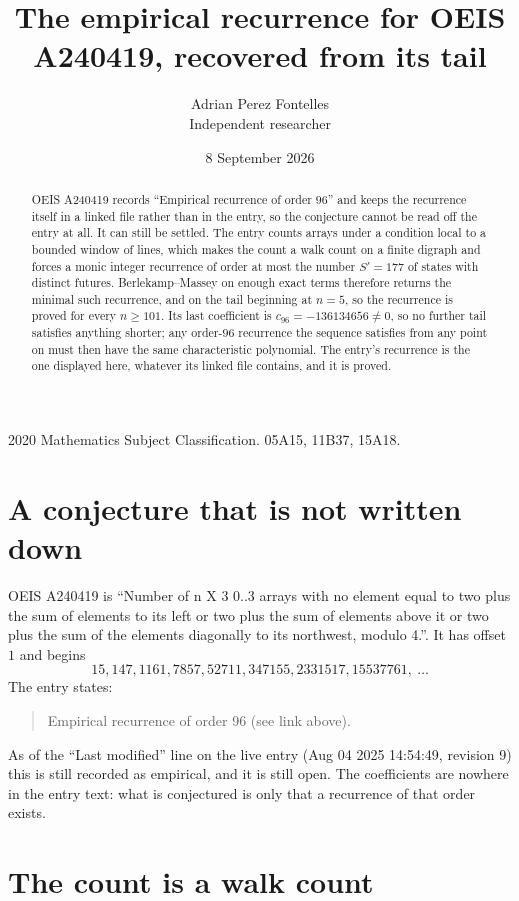 \documentclass[11pt,a4paper]{article}
\title{The empirical recurrence for OEIS A240419, recovered from its tail}
\author{Adrian Perez Fontelles\\ \small Independent researcher}
\date{8 September 2026}
\theoremstyle{plain}
\theoremstyle{definition}
\begin{document}
\maketitle

\begin{abstract}
OEIS A240419 records ``Empirical recurrence of order $96$'' and keeps the recurrence itself in
a linked file rather than in the entry, so the conjecture cannot be read off the entry at all.
It can still be settled. The entry counts arrays under a condition local to a bounded window of
lines, which makes the count a walk count on a finite digraph and forces a monic integer
recurrence of order at most the number $S'=177$ of states with distinct futures. Berlekamp--Massey on
enough exact terms therefore returns the minimal such recurrence, and on the tail beginning at $n=5$, so the recurrence is proved for every $n\ge101$.
Its last coefficient is $c_{96}=-136134656\neq0$, so no further tail satisfies anything
shorter; any order-$96$ recurrence the sequence satisfies from any point on must then have
the same characteristic polynomial. The entry's recurrence is the one displayed here, whatever
its linked file contains, and it is proved.
\end{abstract}

\noindent\small 2020 Mathematics Subject Classification. 05A15, 11B37, 15A18.\normalsize

\section{A conjecture that is not written down}

OEIS A240419 is ``Number of n X 3 0..3 arrays with no element equal to two plus the sum of elements to its left or two plus the sum of elements above it or two plus the sum of the elements diagonally to its northwest, modulo 4.''. It has offset $1$ and begins
\[
15, 147, 1161, 7857, 52711, 347155, 2331517, 15537761,\ \dots
\]
The entry states:
\begin{quote}
Empirical recurrence of order 96 (see link above).
\end{quote}
As of the ``Last modified'' line on the live entry (Aug 04 2025 14:54:49, revision 9)
this is still recorded as empirical, and it is still open. The coefficients are nowhere in the
entry text: what is conjectured is only that a recurrence of that order exists.

\section{The count is a walk count}
\end{document}
